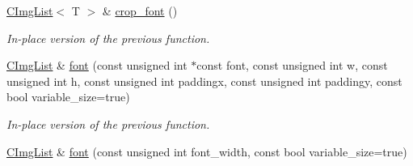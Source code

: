 \begin{DoxyCompactItemize}
\item 
\hypertarget{structcimg__library_1_1_c_img_list_a05b1aea104e9ab6639f4d164f6139f34}{\hyperlink{structcimg__library_1_1_c_img_list}{C\-Img\-List}$<$ T $>$ \& \hyperlink{structcimg__library_1_1_c_img_list_a05b1aea104e9ab6639f4d164f6139f34}{crop\-\_\-font} ()}\label{structcimg__library_1_1_c_img_list_a05b1aea104e9ab6639f4d164f6139f34}

\begin{DoxyCompactList}\small\item\em In-\/place version of the previous function. \end{DoxyCompactList}\item 
\hypertarget{structcimg__library_1_1_c_img_list_a15831a333586e9ea8a6065455bb04ca8}{\hyperlink{structcimg__library_1_1_c_img_list}{C\-Img\-List} \& \hyperlink{structcimg__library_1_1_c_img_list_a15831a333586e9ea8a6065455bb04ca8}{font} (const unsigned int $\ast$const font, const unsigned int w, const unsigned int h, const unsigned int paddingx, const unsigned int paddingy, const bool variable\-\_\-size=true)}\label{structcimg__library_1_1_c_img_list_a15831a333586e9ea8a6065455bb04ca8}

\begin{DoxyCompactList}\small\item\em In-\/place version of the previous function. \end{DoxyCompactList}\item 
\hypertarget{structcimg__library_1_1_c_img_list_ad3117c6c357db9937ef925a561ec13ab}{\hyperlink{structcimg__library_1_1_c_img_list}{C\-Img\-List} \& \hyperlink{structcimg__library_1_1_c_img_list_ad3117c6c357db9937ef925a561ec13ab}{font} (const unsigned int font\-\_\-width, const bool variable\-\_\-size=true)}\label{structcimg__library_1_1_c_img_list_ad3117c6c357db9937ef925a561ec13ab}


\end{DoxyCompactItemize}
